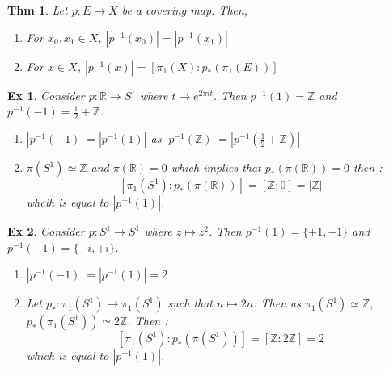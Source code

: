 \documentclass[paper=a4, fontsize=11pt]{scrartcl}
\newtheorem{theorem}{Thm}
\newtheorem{example}{Ex}
\begin{document}
\begin{theorem}
	Let $p:E\to X$ be a covering map. Then, 
	\begin{enumerate}[label=\arabic*)]
		\item For $x_0,x_1 \in X$, $|p^{-1}(x_0)|=|p^{-1}(x_1)|$
		\item For $x\in X$, $|p^{-1}(x)| = [\pi_1(X) : p_\ast(\pi_1(E))]$
	\end{enumerate}
\end{theorem}

\vspace{0.15in}

\begin{example} 
	Consider $p:\mathbb{R} \to S^1$ where $t \mapsto e^{2\pi i t}$. Then $p^{-1}(1)=\mathbb{Z}$ and $p^{-1}(-1)=\frac{1}{2}+\mathbb{Z}$.
	\begin{enumerate}[label=(\arabic*)]
		\item $|p^{-1}(-1)|=|p^{-1}(1)|$ as $|p^{-1}(\mathbb{Z})|=|p^{-1}(\frac{1}{2}+\mathbb{Z})|$
		\item $\pi(S^1)\simeq \mathbb{Z}$ and $\pi(\mathbb{R})=0$ which implies that $p_\ast(\pi(\mathbb{R}))=0$ then :
		\begin{equation}\nonumber
			[\pi_1(S^1):p_\ast(\pi(\mathbb{R}))] = [\mathbb{Z}:0] = |\mathbb{Z}|
		\end{equation}
		whcih is equal to $|p^{-1}(1)|$.
	\end{enumerate}
\end{example}

\vspace{0.15in}

\begin{example}
	Consider $p:S^1\to S^1$ where $z \mapsto z^2$. Then $p^{-1}(1)=\{+1,-1\}$ and $p^{-1}(-1)=\{-i,+i\}$.
	\begin{enumerate}[label=(\arabic*)]
		\item  $|p^{-1}(-1)|=|p^{-1}(1)|=2$
		\item Let $p_\ast : \pi_1(S^1) \to \pi_1(S^1)$ such that $n \mapsto 2n$. Then as $\pi_1(S^1)\simeq \mathbb{Z}$, $p_\ast(\pi_1(S^1))\simeq 2\mathbb{Z}$. Then :
		\begin{equation}\nonumber
			[\pi_1(S^1):p_\ast(\pi(S^1))] = [\mathbb{Z} : 2\mathbb{Z}] = 2
		\end{equation}
		which is equal to $|p^{-1}(1)|$.\\
	\end{enumerate}
\end{example}
\end{document}
